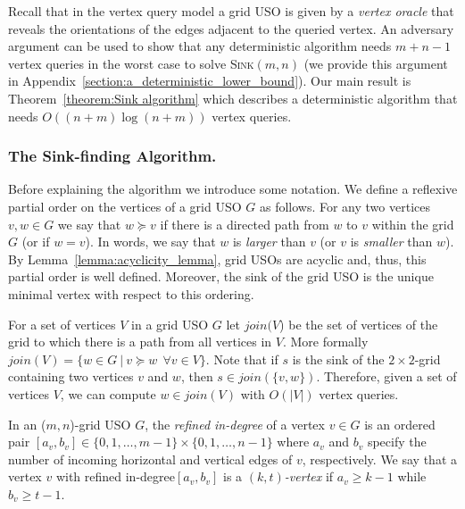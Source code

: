 \documentclass[runningheads,a4paper]{llncs}
\newcommand{\JN}[1]{\marginpar{\parbox{3.6cm}{{\small {\bf JN:} #1}}}} %
\newcommand{\indegree}{refined in-degree\xspace}
\newcommand{\sinkmn}{\textsc{Sink}$(m,n)$\xspace}
\begin{document}
Recall that in the vertex query model a grid USO is given by a \emph{vertex oracle} that reveals the orientations of the edges adjacent to the queried vertex. 
An adversary argument can be used to show that any deterministic algorithm needs $m+n-1$ vertex queries in the worst case to solve \sinkmn
(we provide this argument in Appendix~\ref{section:a_deterministic_lower_bound}).
Our main result is Theorem~\ref{theorem:Sink algorithm} which describes a deterministic algorithm that needs $O((n + m) \log (n + m))$ vertex queries. 

\subsubsection{The Sink-finding Algorithm.}
\label{section:the_sink_finding_algorithm}

Before explaining the algorithm we introduce some notation. We define a reflexive partial order on the vertices of a grid USO $G$ as follows. 
For any two vertices $v,w \in G$ we say that $w \succeq v$ if there is a directed path from $w$ to $v$ within the grid $G$ (or if $w = v$). 
In words, we say that $w$ is \emph{larger} than $v$ (or $v$ is \emph{smaller} than $w$).
By Lemma~\ref{lemma:acyclicity_lemma}, grid USOs are acyclic and, thus, this partial order is well defined.
Moreover, the sink of the grid USO is the unique minimal vertex with respect to this ordering. 

For a set of vertices $V$ in a grid USO $G$ let $join(V$) be the set of vertices of the grid to which there is a path from all vertices in $V$.  More formally $join(V) = \{w \in G \: | \: v \succeq w \:\: \forall v \in V \}$. Note that if $s$ is the sink of the $2\times 2$-grid containing two vertices $v$ and $w$, then $s \in join(\{v,w\})$. Therefore, given a set of vertices $V$, we can compute  $w \in join(V)$ with $O(|V|)$ vertex queries.


In an ($m,n$)-grid USO $G$, the \emph{\indegree} of a vertex $v \in G$ is an ordered pair $[a_v, b_v] \in \{0,1,\ldots,m-1\}\times \{0,1,\ldots,n-1\}$ where $a_v$ and $b_v$ specify the number of incoming horizontal  and vertical edges of $v$, respectively.
We say that a vertex $v$ with \indegree $[a_v, b_v]$ is a \emph{$(k, t)$-vertex} if $a_v\geq k-1$ while $b_v\geq t-1$.
\end{document}
